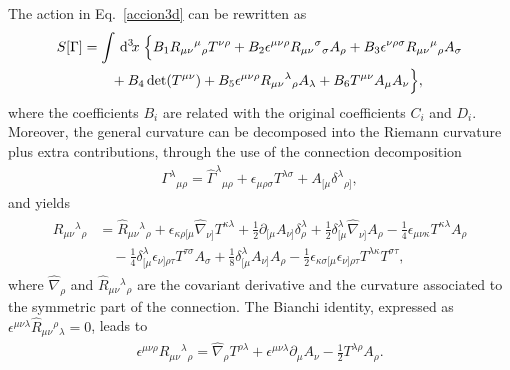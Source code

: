 \documentclass[%
  showpacs,showkeys,prd,superscriptaddress]{revtex4-1}
\begin{document}
The action in Eq.~\eqref{accion3d} can be rewritten as 
\begin{align}
  \label{accion3dnew}
  \begin{split}
    S[\Gamma]&=\int\,{\mathrm{d}}^{3}\!{x}\; \Big\{ B_1R_{\mu\nu}{}^\mu{}_{\rho} T^{\nu\rho} + B_2\epsilon^{\mu\nu\rho}R_{\mu\nu}{}^{\sigma}{}_\sigma A_\rho + B_3\epsilon^{\nu\rho\sigma}R_{\mu\nu}{}^{\mu}{}_\rho A_\sigma\\
    & \qquad + B_4 \det(T^{\mu\nu}) + B_5 \epsilon^{\mu\nu\rho}R_{\mu\nu}{}^\lambda{}_\rho A_\lambda + B_6 T^{\mu\nu}A_\mu A_\nu \Big\},
  \end{split}
\end{align}
where the coefficients $B_i$ are related with the original coefficients $C_i$ and $D_i$. Moreover, the general curvature can be decomposed into the Riemann curvature plus extra contributions, through the use of the connection decomposition %
\begin{align}
  \Gamma^\lambda{}_{\mu\rho}=\hat{\Gamma}^\lambda{}_{\mu\rho}+\epsilon_{\mu\rho\sigma}T^{\lambda\sigma}+A_{[\mu}\delta^\lambda{}_{\rho]},
  \label{gammadecomp3}
\end{align}
and yields
\begin{align}
  \label{RiemmanDecomposition}
  \begin{split}
    R_{\mu\nu}{}^\lambda{}_\rho&=
    \hat{R}_{\mu\nu}{}^\lambda{}_\rho+\epsilon_{\kappa\rho[\mu}\hat\nabla_{\nu]}T^{\kappa\lambda}+\frac{1}{2}\partial_{[\mu}A_{\nu]}\delta^\lambda_\rho+\frac{1}{2}\delta^\lambda_{[\mu}\hat\nabla_{\nu]}A_\rho-\frac{1}{4}\epsilon_{\mu\nu\kappa}T^{\kappa\lambda}A_\rho\\
    & \quad -\frac{1}{4}\delta^\lambda_{[\mu}\epsilon_{\nu]\rho\tau}T^{\tau\sigma}A_\sigma + \frac{1}{8}\delta_{[\mu}^\lambda A_{\nu]}A_\rho-\frac{1}{2}\epsilon_{\kappa\sigma[\mu}\epsilon_{\nu]\rho\tau}T^{\lambda\kappa}T^{\sigma\tau},
  \end{split}
\end{align}
where $ \hat{\nabla}_\rho$ and $\hat{R}_{\mu\nu}{}^\lambda{}_\rho$ are the covariant derivative and the curvature associated to the symmetric part of the connection. The Bianchi identity, expressed  as $\epsilon^{\mu\nu\lambda}\hat{R}_{\mu\nu}{}^\rho{}_\lambda=0$, leads  to
\begin{align}
  \label{bianchi}
  \epsilon^{\mu\nu\rho} R_{\mu\nu}{}^\lambda{}_\rho = \hat{\nabla}_\rho T^{\rho\lambda}+\epsilon^{\mu\nu\lambda}\partial_\mu A_\nu -\frac{1}{2}T^{\lambda\rho}A_\rho. 
\end{align}
\end{document}
